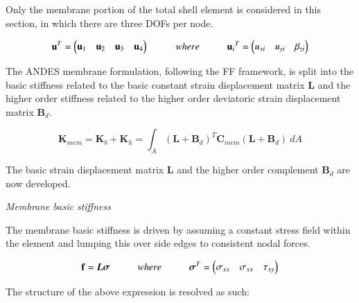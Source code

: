 Only the membrane portion of the total shell element is considered in this section, in which there are three DOFs per node.

\begin{equation} 
\mathbf{u}^T = 
\begin{pmatrix}
\mathbf{u}_1 & \mathbf{u}_2 & \mathbf{u}_3 & \mathbf{u}_4
\end{pmatrix} 
\hspace{10mm}
where
\hspace{10mm}
\mathbf{u}{_i}^T = 
\begin{pmatrix}
{u_{xi}} & {u_{yi}} & {\beta_{zi}}
\end{pmatrix}
\label{equation04}
\end{equation}

The ANDES membrane formulation, following the FF framework, is split into the basic stiffness related to the basic constant strain displacement matrix $\mathbf{L}$ and the higher order stiffness related to the higher order deviatoric strain displacement matrix $\mathbf{B}_d$.

\begin{equation} 
\mathbf{K}_{mem} = \mathbf{K}_{b} + \mathbf{K}_{h} = \int_A (\mathbf{L} + \mathbf{B}_d)^T \mathbf{C}_{mem} (\mathbf{L} + \mathbf{B}_d)\ dA
\label{equationMEM}
\end{equation}

The basic strain displacement matrix $\mathbf{L}$ and the higher order complement $\mathbf{B}_d$ are now developed. 

\textit{Membrane basic stiffness}

The membrane basic stiffness is driven by assuming a constant stress field within the element and lumping this over side edges to consistent nodal forces. 

\begin{equation} 
\mathbf{f} = \boldsymbol{L\sigma}
\hspace{10mm}
where
\hspace{10mm}
\boldsymbol{\sigma}^T =
\begin{pmatrix}
\sigma_{xx} & \sigma_{xx} & \tau_{xy}
\end{pmatrix}
\label{equation05}
\end{equation}

The structure of the above expression is resolved as such: 

